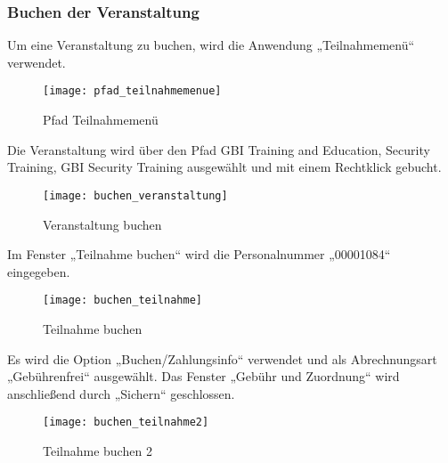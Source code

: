 \subsubsection{Buchen der Veranstaltung}
Um eine Veranstaltung zu buchen, wird die Anwendung „Teilnahmemenü“ verwendet.
\begin{figure}[H]
	\centering
	\texttt{[image: pfad\_teilnahmemenue]}
	\caption{Pfad Teilnahmemenü}
	\label{fig:pfad_teilnahmemenue}
\end{figure}
Die Veranstaltung wird über den Pfad GBI Training and Education, Security Training, GBI Security Training ausgewählt und mit einem Rechtklick gebucht.
\begin{figure}[H]
	\centering
	\texttt{[image: buchen\_veranstaltung]}
	\caption{Veranstaltung buchen}
	\label{fig:buchen_veranstaltung}
\end{figure}
Im Fenster „Teilnahme buchen“ wird die Personalnummer „00001084“ eingegeben.
\begin{figure}[H]
	\centering
	\texttt{[image: buchen\_teilnahme]}
	\caption{Teilnahme buchen}
	\label{fig:buchen_teilnahme}
\end{figure}
Es wird die Option „Buchen/Zahlungsinfo“ verwendet und als Abrechnungsart „Gebührenfrei“ ausgewählt. Das Fenster „Gebühr und Zuordnung“ wird anschließend durch „Sichern“ geschlossen. 
\begin{figure}[H]
	\centering
	\texttt{[image: buchen\_teilnahme2]}
	\caption{Teilnahme buchen 2}
	\label{fig:buchen_teilnahme2}
\end{figure}

